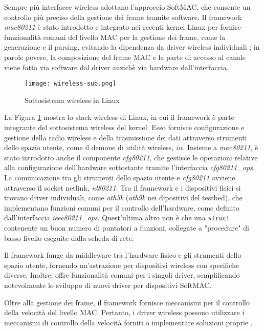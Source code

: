Sempre più interfacce wireless adottano l'approccio SoftMAC, che consente un controllo più preciso della gestione dei frame tramite software. Il framework \textit{mac80211} è stato introdotto e integrato nei recenti kernel Linux per fornire funzionalità comuni del livello MAC per la gestione dei frame, come la generazione e il parsing, evitando la dipendenza da driver wireless individuali \cite{wireless-profiling}; in parole povere, la composizione del frame MAC e la parte di accesso al canale viene fatta via software dal driver anzichè via hardware dall'interfaccia.

\begin{figure}[h!]
    \centering
    \texttt{[image: wireless-sub.png]}
    \caption{Sottosistema wireless in Linux}
    \label{fig:wireless-sub}
\end{figure}

La Figura \ref{fig:wireless-sub} mostra lo stack wireless di Linux, in cui il framework è parte integrante del sottosistema wireless del kernel. Esso fornisce configurazione e gestione della radio wireless e della trasmissione dei dati attraverso strumenti dello spazio utente, come il demone di utilità wireless, \textit{iw}. Insieme a \textit{mac80211}, è stato introdotto anche il componente \textit{cfg80211}, che gestisce le operazioni relative alla configurazione dell'hardware sottostante tramite l'interfaccia \textit{cfg80211\_ops}. La comunicazione tra gli strumenti dello spazio utente e \textit{cfg80211} avviene attraverso il socket netlink, \textit{nl80211}. Tra il framework e i dispositivi fisici si trovano driver individuali, come \textit{ath5k} (\textit{ath9k} nei dipositivi del testbed), che implementano funzioni comuni per il controllo dell'hardware, come definito dall'interfaccia \textit{ieee80211\_ops}. Quest'ultima altro non è che una \verb|struct| contenente un buon numero di puntatori a funzioni, collegate a "procedure" di basso livello eseguite dalla scheda di rete.

Il framework funge da middleware tra l'hardware fisico e gli strumenti dello spazio utente, fornendo un'astrazione per dispositivi wireless con specifiche diverse. Inoltre, offre funzionalità comuni per i singoli driver, semplificando notevolmente lo sviluppo di nuovi driver per dispositivi SoftMAC.

Oltre alla gestione dei frame, il framework fornisce meccanismi per il controllo della velocità del livello MAC. Pertanto, i driver wireless possono utilizzare i meccanismi di controllo della velocità forniti o implementare soluzioni proprie \cite{wireless-profiling}.



